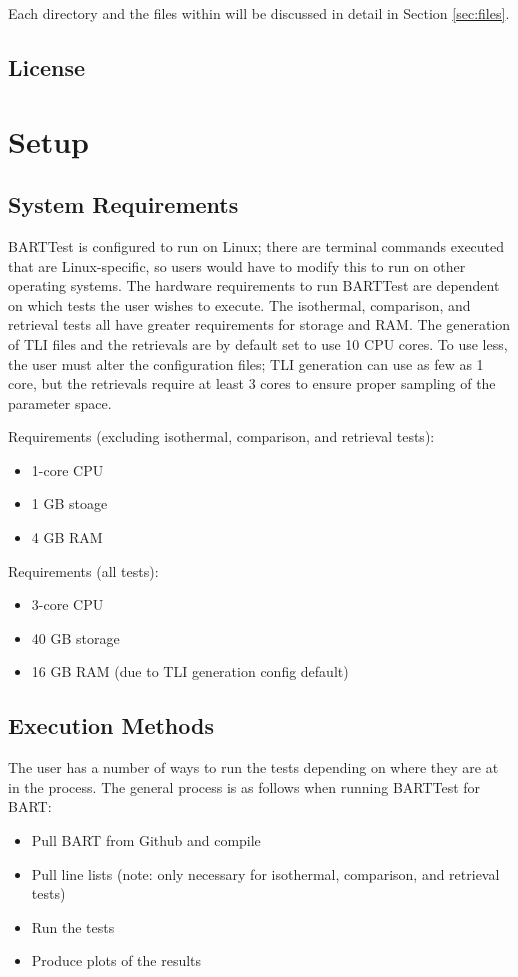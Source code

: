 \documentclass[letterpaper, 12pt]{article}
\begin{document}
Each directory and the files within will be discussed in detail in 
Section \ref{sec:files}.

\pagebreak
\subsection{License}
\label{sec:license}

\section{Setup}
\label{sec:setup}

\subsection{System Requirements}
\label{sec:requirements}
BARTTest is configured to run on Linux; there are terminal commands executed 
that are Linux-specific, so users would have to modify this to run on other 
operating systems. The hardware requirements to run BARTTest are dependent on 
which tests the user wishes to execute. The isothermal, comparison, and 
retrieval tests all have greater requirements for storage and RAM. The 
generation of TLI files and the retrievals are by default set to use 10 CPU 
cores. To use less, the user must alter the configuration files; TLI generation 
can use as few as 1 core, but the retrievals require at least 3 cores to ensure 
proper sampling of the parameter space.

Requirements (excluding isothermal, comparison, and retrieval tests):
\begin{itemize} \itemsep0pt
  \item 1-core CPU
  \item 1 GB stoage
  \item 4 GB RAM
\end{itemize}

Requirements (all tests):
\begin{itemize} \itemsep0pt
  \item 3-core CPU
  \item 40 GB storage
  \item 16 GB RAM (due to TLI generation config default)
\end{itemize}

\subsection{Execution Methods}
\label{sec:commands}
The user has a number of ways to run the tests depending on where they are at 
in the process. The general process is as follows when running BARTTest for 
BART:
\begin{itemize} \itemsep0pt
  \item Pull BART from Github and compile
  \item Pull line lists (note: only necessary for 
        isothermal, comparison, and retrieval tests)
  \item Run the tests
  \item Produce plots of the results
\end{itemize}
\end{document}
